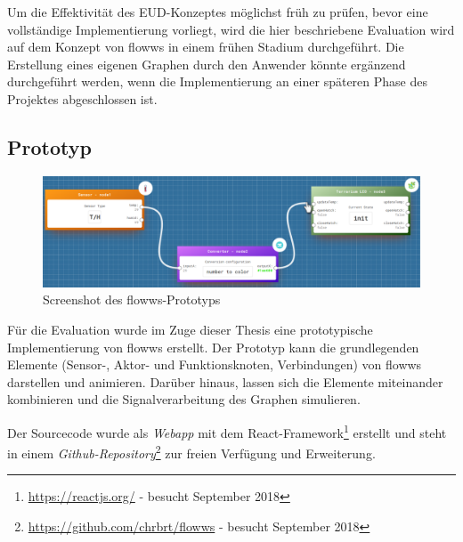 Um die Effektivität des \ac{EUD}-Konzeptes möglichst früh zu prüfen, bevor eine vollständige Implementierung vorliegt, wird die hier beschriebene Evaluation wird auf dem Konzept von flowws in einem frühen Stadium durchgeführt. Die Erstellung eines eigenen Graphen durch den Anwender könnte ergänzend durchgeführt werden, wenn die Implementierung an einer späteren Phase des Projektes abgeschlossen ist. 

\subsection{Prototyp}

\begin{figure}[h]
  \centering
  \includegraphics[width=1\textwidth]{bilder/chapter5/screenshotflows.pdf}
  \caption{Screenshot des flowws-Prototyps}
  \label{fig:genericnode}
\end{figure}

Für die Evaluation wurde im Zuge dieser Thesis eine prototypische Implementierung von flowws erstellt. Der Prototyp kann die grundlegenden Elemente (Sensor-, Aktor- und Funktionsknoten, Verbindungen) von flowws darstellen und animieren. Darüber hinaus, lassen sich die Elemente miteinander kombinieren und die Signalverarbeitung des Graphen simulieren.

Der Sourcecode wurde als \textit{Webapp} mit dem React-Framework\footnote{\url{https://reactjs.org/} - besucht September 2018} erstellt und steht in einem \textit{Github-Repository}\footnote{\url{https://github.com/chrbrt/flowws} - besucht September 2018} zur freien Verfügung und Erweiterung.